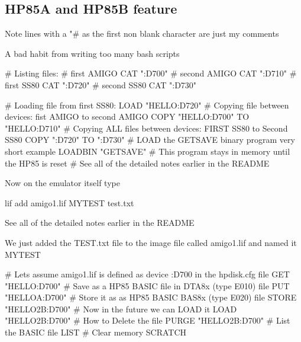 \subsection*{H\+P85A and H\+P85B feature}


\begin{DoxyItemize}
\item Note lines with a "\#\textquotesingle{} as the first non blank character are just my comments
\begin{DoxyItemize}
\item A bad habit from writing too many bash scripts
\end{DoxyItemize}
\end{DoxyItemize}


\begin{DoxyPre}
  \# Listing files:
  \# first AMIGO
  CAT ":D700"
  \# second AMIGO
  CAT ":D710"
  \# first SS80
  CAT ":D720"
  \# second SS80
  CAT ":D730"\end{DoxyPre}



\begin{DoxyPre}  \# Loading file from first SS80:
  LOAD "HELLO:D720"
  \# Copying file between devices: fist AMIGO to second AMIGO
  COPY "HELLO:D700" TO "HELLO:D710"
  \# Copying ALL files between devices: FIRST SS80 to Second SS80
  COPY ":D720" TO ":D730"
  \# LOAD the GETSAVE binary program very short example
  LOADBIN "GETSAVE"
  \# This program stays in memory until the HP85 is reset
  \# See all of the detailed notes earlier in the README 
\end{DoxyPre}

\begin{DoxyItemize}
\item Now on the emulator itself type
\item lif add amigo1.\+lif M\+Y\+T\+E\+ST test.\+txt
\begin{DoxyItemize}
\item See all of the detailed notes earlier in the R\+E\+A\+D\+ME
\end{DoxyItemize}
\item We just added the T\+E\+S\+T.\+txt file to the image file called amigo1.\+lif and named it M\+Y\+T\+E\+ST 
\begin{DoxyPre}
  \# Lets assume amigo1.lif is defined as device :D700 in the hpdisk.cfg file
  GET "HELLO:D700"
  \# Save as a HP85 BASIC file in DTA8x (type E010) file
  PUT "HELLOA:D700"
  \# Store it as as HP85 BASIC BAS8x (type E020) file
  STORE "HELLO2B:D700"
  \# Now in the future we can LOAD it 
  LOAD "HELLO2B:D700"
  \# How to Delete the file 
  PURGE "HELLO2B:D700"
  \# List the BASIC file
  LIST
  \# Clear memory
  SCRATCH
\end{DoxyPre}

\end{DoxyItemize}



